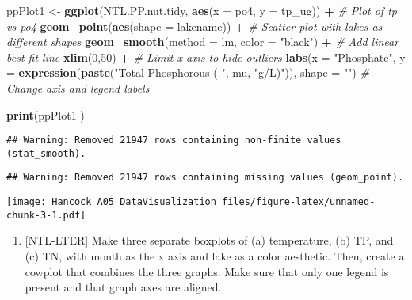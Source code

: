 \documentclass[
]{article}
\newenvironment{Shaded}{\begin{snugshade}}{\end{snugshade}}
\newcommand{\CommentTok}[1]{\textcolor[rgb]{0.56,0.35,0.01}{\textit{#1}}}
\newcommand{\DataTypeTok}[1]{\textcolor[rgb]{0.13,0.29,0.53}{#1}}
\newcommand{\DecValTok}[1]{\textcolor[rgb]{0.00,0.00,0.81}{#1}}
\newcommand{\KeywordTok}[1]{\textcolor[rgb]{0.13,0.29,0.53}{\textbf{#1}}}
\newcommand{\NormalTok}[1]{#1}
\newcommand{\OperatorTok}[1]{\textcolor[rgb]{0.81,0.36,0.00}{\textbf{#1}}}
\newcommand{\StringTok}[1]{\textcolor[rgb]{0.31,0.60,0.02}{#1}}
\providecommand{\tightlist}{%
  \setlength{\itemsep}{0pt}\setlength{\parskip}{0pt}}
\begin{document}
\begin{Shaded}
\begin{Highlighting}[]
\NormalTok{ppPlot1 <-}\StringTok{ }\KeywordTok{ggplot}\NormalTok{(NTL.PP.nut.tidy, }\KeywordTok{aes}\NormalTok{(}\DataTypeTok{x =}\NormalTok{ po4, }\DataTypeTok{y =}\NormalTok{ tp_ug)) }\OperatorTok{+}\StringTok{ }\CommentTok{# Plot of tp vs po4}
\StringTok{  }\KeywordTok{geom_point}\NormalTok{(}\KeywordTok{aes}\NormalTok{(}\DataTypeTok{shape =}\NormalTok{ lakename)) }\OperatorTok{+}\StringTok{ }\CommentTok{# Scatter plot with lakes as different shapes}
\StringTok{  }\KeywordTok{geom_smooth}\NormalTok{(}\DataTypeTok{method =}\NormalTok{ lm, }\DataTypeTok{color =} \StringTok{"black"}\NormalTok{) }\OperatorTok{+}\StringTok{ }\CommentTok{# Add linear best fit line}
\StringTok{  }\KeywordTok{xlim}\NormalTok{(}\DecValTok{0}\NormalTok{,}\DecValTok{50}\NormalTok{) }\OperatorTok{+}\StringTok{ }\CommentTok{# Limit x-axis to hide outliers}
\StringTok{  }\KeywordTok{labs}\NormalTok{(}\DataTypeTok{x =} \StringTok{"Phosphate"}\NormalTok{, }\DataTypeTok{y =} \KeywordTok{expression}\NormalTok{(}\KeywordTok{paste}\NormalTok{(}\StringTok{"Total Phosphorous ( "}\NormalTok{, mu, }\StringTok{"g/L)"}\NormalTok{)),}
       \DataTypeTok{shape =} \StringTok{""}\NormalTok{) }\CommentTok{# Change axis and legend labels}

\KeywordTok{print}\NormalTok{(ppPlot1 )}
\end{Highlighting}
\end{Shaded}

\begin{verbatim}
## Warning: Removed 21947 rows containing non-finite values (stat_smooth).
\end{verbatim}

\begin{verbatim}
## Warning: Removed 21947 rows containing missing values (geom_point).
\end{verbatim}

\texttt{[image: Hancock\_A05\_DataVisualization\_files/figure-latex/unnamed-chunk-3-1.pdf]}

\begin{enumerate}
\def\labelenumi{\arabic{enumi}.}
\setcounter{enumi}{4}
\tightlist
\item
  {[}NTL-LTER{]} Make three separate boxplots of (a) temperature, (b)
  TP, and (c) TN, with month as the x axis and lake as a color
  aesthetic. Then, create a cowplot that combines the three graphs. Make
  sure that only one legend is present and that graph axes are aligned.
\end{enumerate}
\end{document}
